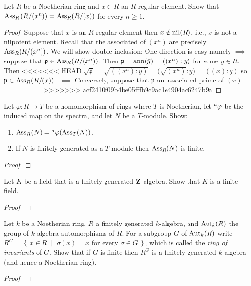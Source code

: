 \newpage
\begin{problem}
Let $R$ be a Noetherian ring and $x\in R$ an $R$-regular
element. Show that $\operatorname{Ass}_R\left(R/(x^n)\right)=\operatorname{Ass}_R(R/(x))$ for
every $n\geq 1$.
\end{problem}
\begin{proof}
Suppose that $x$ is an $R$-regular element then $x\notin\operatorname{nil}(R)$,
i.e., $x$ is not a nilpotent element. Recall that the associated
of $(x^n)$ are precisely $\operatorname{Ass}_R(R/(x^n))$. We will show double
inclusion: One direction is easy namely $\implies$ suppose that
$\mathfrak{p}\in\operatorname{Ass}_R(R/(x^n))$. Then $\mathfrak{p}=\operatorname{ann}(\bar
y)=((x^n):y)$ for some $y\in R$. Then
<<<<<<< HEAD
$\sqrt{\mathfrak{p}}=\sqrt{((x^n):y)}=\bigl(\sqrt{(x^n)}:y\bigr)=((x):y)$
so $\mathfrak{p}\in\operatorname{Ass}_R(R/(x))$. $\impliedby$ Conversely, suppose that
$\mathfrak{p}$ an associated prime of $(x)$.
=======
>>>>>>> acf2410f09b4be05fffb9c9ac1e4904ac6247b9a
\end{proof}
\newpage
\begin{problem}
Let $\varphi\colon R\to T$ be a homomorphism of rings where $T$ is
Noetherian, let $\prescript{a}{}\varphi$ be the induced map on the spectra,
and let $N$ be a $T$-module. Show:
\begin{enumerate}[label=(\alph*)]
\item $\operatorname{Ass}_R(N)=\prescript{a}{}\varphi(\operatorname{Ass}_T(N))$.
\item If $N$ is finitely generated as a $T$-module then
  $\operatorname{Ass}_R(N)$ is finite.
\end{enumerate}
\end{problem}
\begin{proof}
\end{proof}
\newpage
\begin{problem}
Let $K$ be a field that is a finitely generated
$\mathbf{Z}$-algebra. Show that $K$ is a finite field.
\end{problem}
\begin{proof}
\end{proof}
\newpage
\begin{problem}
Let $k$ be a Noetherian ring, $R$ a finitely generated
$k$-algebra, and $\operatorname{Aut}_k(R)$ the group of $k$-algebra
automorphisms of $R$. For a subgroup $G$ of $\operatorname{Aut}_k(R)$ write
$R^G=\left\{\,x\in R\;\middle|\;\text{$\sigma(x)=x$ for every
    $\sigma\in G$}\,\right\}$, which is called the \emph{ring of
  invariants} of $G$. Show that if $G$ is finite then $R^G$ is a
finitely generated $k$-algebra (and hence a Noetherian ring).
\end{problem}
\begin{proof}
\end{proof}

